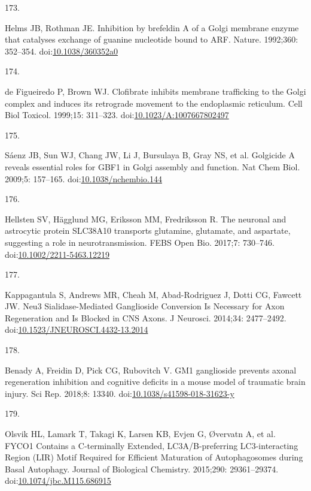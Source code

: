 \documentclass[
  12pt,
  a4paper,
]{book}
\newlength{\cslhangindent}
\newlength{\csllabelwidth}
\newenvironment{CSLReferences}[2] %
 {\begin{list}{}{%
  \setlength{\itemindent}{0pt}
  \setlength{\leftmargin}{0pt}
  \setlength{\parsep}{0pt}
  \ifodd #1
   \setlength{\leftmargin}{\cslhangindent}
   \setlength{\itemindent}{-1\cslhangindent}
  \fi
  \setlength{\itemsep}{#2\baselineskip}}}
 {\end{list}}
\newcommand{\CSLLeftMargin}[1]{\parbox[t]{\csllabelwidth}{\strut#1\strut}}
\newcommand{\CSLRightInline}[1]{\parbox[t]{\linewidth - \csllabelwidth}{\strut#1\strut}}
\begin{document}
\begin{CSLReferences}{0}{1}
\CSLLeftMargin{173. }%
\CSLRightInline{Helms JB, Rothman JE. Inhibition by brefeldin {A} of a {Golgi} membrane enzyme that catalyses exchange of guanine nucleotide bound to {ARF}. Nature. 1992;360: 352--354. doi:\href{https://doi.org/10.1038/360352a0}{10.1038/360352a0}}

\CSLLeftMargin{174. }%
\CSLRightInline{de Figueiredo P, Brown WJ. Clofibrate inhibits membrane trafficking to the {Golgi} complex and induces its retrograde movement to the endoplasmic reticulum. Cell Biol Toxicol. 1999;15: 311--323. doi:\href{https://doi.org/10.1023/A:1007667802497}{10.1023/A:1007667802497}}

\CSLLeftMargin{175. }%
\CSLRightInline{Sáenz JB, Sun WJ, Chang JW, Li J, Bursulaya B, Gray NS, et al. Golgicide {A} reveals essential roles for {GBF1} in {Golgi} assembly and function. Nat Chem Biol. 2009;5: 157--165. doi:\href{https://doi.org/10.1038/nchembio.144}{10.1038/nchembio.144}}

\CSLLeftMargin{176. }%
\CSLRightInline{Hellsten SV, Hägglund MG, Eriksson MM, Fredriksson R. The neuronal and astrocytic protein {SLC38A10} transports glutamine, glutamate, and aspartate, suggesting a role in neurotransmission. FEBS Open Bio. 2017;7: 730--746. doi:\href{https://doi.org/10.1002/2211-5463.12219}{10.1002/2211-5463.12219}}

\CSLLeftMargin{177. }%
\CSLRightInline{Kappagantula S, Andrews MR, Cheah M, Abad-Rodriguez J, Dotti CG, Fawcett JW. Neu3 {Sialidase-Mediated Ganglioside Conversion Is Necessary} for {Axon Regeneration} and {Is Blocked} in {CNS Axons}. J Neurosci. 2014;34: 2477--2492. doi:\href{https://doi.org/10.1523/JNEUROSCI.4432-13.2014}{10.1523/JNEUROSCI.4432-13.2014}}

\CSLLeftMargin{178. }%
\CSLRightInline{Benady A, Freidin D, Pick CG, Rubovitch V. {GM1} ganglioside prevents axonal regeneration inhibition and cognitive deficits in a mouse model of traumatic brain injury. Sci Rep. 2018;8: 13340. doi:\href{https://doi.org/10.1038/s41598-018-31623-y}{10.1038/s41598-018-31623-y}}

\CSLLeftMargin{179. }%
\CSLRightInline{Olsvik HL, Lamark T, Takagi K, Larsen KB, Evjen G, Øvervatn A, et al. {FYCO1 Contains} a {C-terminally Extended}, {LC3A}/{B-preferring LC3-interacting Region} ({LIR}) {Motif Required} for {Efficient Maturation} of {Autophagosomes} during {Basal Autophagy}. Journal of Biological Chemistry. 2015;290: 29361--29374. doi:\href{https://doi.org/10.1074/jbc.M115.686915}{10.1074/jbc.M115.686915}}


\end{CSLReferences}
\end{document}
